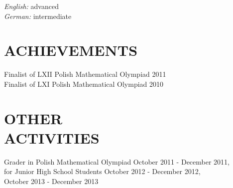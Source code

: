 \documentclass[margin, 10pt]{res} %
\begin{document}
\begin{resume}
{\sl English:} advanced \\
{\sl German:} intermediate



\section{ ACHIEVEMENTS } 

Finalist of LXII Polish Mathematical Olympiad \hfill 2011 \\
Finalist of LXI Polish Mathematical Olympiad \hfill 2010


\section{ OTHER \\ ACTIVITIES } 

Grader in Polish Mathematical Olympiad \hfill October 2011 - December 2011, \\
for Junior High School Students \hfill October 2012 - December 2012, \\
\hspace*{0pt} \hfill October 2013 - December 2013





\end{resume}
\end{document}
